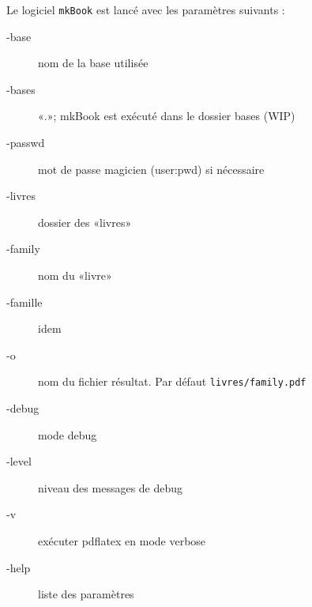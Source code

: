 Le logiciel \verb|mkBook| est lancé avec les paramètres suivants :
\begin{description}
\item[-base] nom de la base utilisée
\item[-bases] «.»; mkBook est exécuté dans le dossier bases (WIP)
\item[-passwd] mot de passe magicien (user:pwd) si nécessaire
\item[-livres] dossier des «livres»
\item[-family] nom du «livre»
\item[-famille] idem
\item[-o] nom du fichier résultat. Par défaut \verb|livres/family.pdf|
\item[-debug] mode debug
\item[-level] niveau des messages de debug
\item[-v] exécuter pdflatex en mode verbose
\item[-help] liste des paramètres
\end{description}


